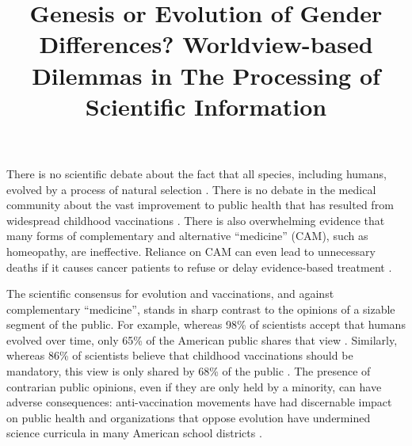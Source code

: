 \documentclass[fignum,man]{apa}\usepackage[]{graphicx}\usepackage[]{color}
\title{Genesis or Evolution of Gender Differences? Worldview-based Dilemmas in The Processing of Scientific Information}
\begin{document}
\maketitle


There is no scientific debate about the fact that all species, including humans, evolved by a process of natural selection \cite{PRC15}. There is no debate in the 
medical community about the
vast improvement to public health that has resulted from
widespread childhood vaccinations \cite{Whitney14}. 
There is also overwhelming evidence that many forms
of complementary and alternative ``medicine'' (CAM), such
as homeopathy, are ineffective. Reliance on CAM can 
even lead to unnecessary deaths if it 
causes cancer patients 
to refuse or delay evidence-based treatment \cite{Johnson18}.

%
%

The scientific consensus for evolution and vaccinations, and against complementary ``medicine'', stands in sharp contrast to the
opinions of a sizable segment of the public. 
For example, whereas 98\% of scientists accept that
humans evolved over time, only 65\% of the American
public shares that view \cite{PRC15}. Similarly, whereas 86\% of scientists believe that 
childhood vaccinations should be mandatory, this view is only 
shared by 68\% of the public \cite{PRC15}.
The presence of contrarian public opinions, even if they 
are only held by a minority, can have adverse 
consequences: anti-vaccination movements have had 
discernable impact
on public health \cite{Gangarosa98,Smith07b} and
organizations that oppose evolution have 
undermined science curricula in many American school 
districts \cite{Watts17}.
\end{document}
